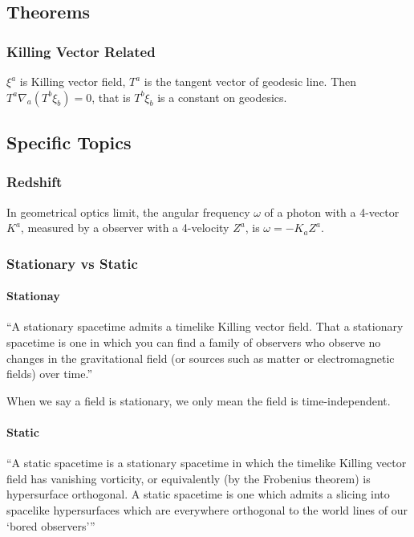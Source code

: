 \documentclass[letterpaper,10pt,english]{sphinxmanual}
\begin{document}
{\subsection{Theorems}
\label{GeneralRelativity:theorems}

\subsubsection{Killing Vector Related}
\label{GeneralRelativity:killing-vector-related}
$\xi^a$ is Killing vector field, $T^a$ is the tangent vector of geodesic line. Then $T^a\nabla_a(T^b\xi_b)=0$, that is $T^b\xi_b$ is a constant on geodesics.


\subsection{Specific Topics}
\label{GeneralRelativity:specific-topics}

\subsubsection{Redshift}
\label{GeneralRelativity:redshift}
In geometrical optics limit, the angular frequency $\omega$ of a photon with a 4-vector $K^a$, measured by a observer with a 4-velocity $Z^a$, is $\omega=-K_aZ^a$.


\subsubsection{Stationary vs Static}
\label{GeneralRelativity:stationary-vs-static}

\paragraph{Stationay}
\label{GeneralRelativity:stationay}
``A stationary spacetime admits a timelike Killing vector field. That a stationary spacetime is one in which you can find a family of observers who observe no changes in the gravitational field (or sources such as matter or electromagnetic fields) over time.''

When we say a field is stationary, we only mean the field is time-independent.


\paragraph{Static}
\label{GeneralRelativity:static}
``A static spacetime is a stationary spacetime in which the timelike Killing vector field has vanishing vorticity, or equivalently (by the Frobenius theorem) is hypersurface orthogonal. A static spacetime is one which admits a slicing into spacelike hypersurfaces which are everywhere orthogonal to the world lines of our `bored observers'''

}
\end{document}
